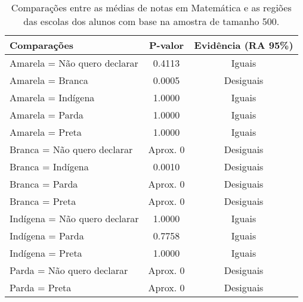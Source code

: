 \begin{table}[htb]
    \centering
\caption{\label{comp_MT}Comparações entre as médias de notas em Matemática e as regiões das escolas dos alunos com base na amostra de tamanho 500.}
    \begin{tabular}{lcc}
    \toprule
    Comparações & P-valor & Evidência (RA 95\%)\\
    \midrule \midrule
    Amarela = Não quero declarar & 0.4113 & Iguais\\
    Amarela = Branca & 0.0005 & Desiguais\\
    Amarela = Indígena & 1.0000 & Iguais\\
    Amarela = Parda & 1.0000 & Iguais\\
    Amarela = Preta & 1.0000 & Iguais\\
    Branca = Não quero declarar & Aprox. 0 & Desiguais\\
    Branca = Indígena & 0.0010 & Desiguais\\
    Branca = Parda & Aprox. 0 & Desiguais\\
    Branca = Preta & Aprox. 0 & Desiguais\\
    Indígena = Não quero declarar & 1.0000 & Iguais\\
    Indígena = Parda & 0.7758 & Iguais\\
    Indígena = Preta & 1.0000  & Iguais\\
    Parda = Não quero declarar & Aprox. 0 & Desiguais\\
    Parda = Preta & Aprox. 0 & Desiguais\\
    \bottomrule
    \end{tabular}
    \centering
    
\end{table}
\clearpage

